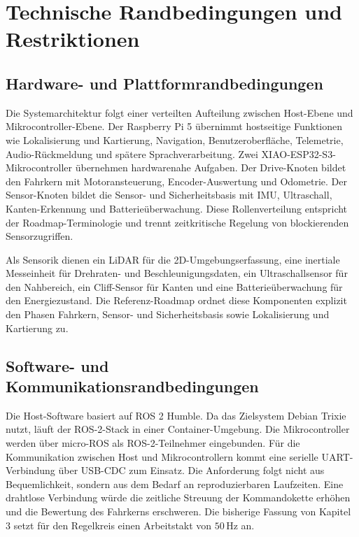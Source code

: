 \section{Technische Randbedingungen und Restriktionen}

\subsection{Hardware- und Plattformrandbedingungen}

Die Systemarchitektur folgt einer verteilten Aufteilung zwischen Host-Ebene und Mikrocontroller-Ebene. Der Raspberry Pi 5 übernimmt hostseitige Funktionen wie Lokalisierung und Kartierung, Navigation, Benutzeroberfläche, Telemetrie, Audio-Rückmeldung und spätere Sprachverarbeitung. Zwei XIAO-ESP32-S3-Mikrocontroller übernehmen hardwarenahe Aufgaben. Der Drive-Knoten bildet den Fahrkern mit Motoransteuerung, Encoder-Auswertung und Odometrie. Der Sensor-Knoten bildet die Sensor- und Sicherheitsbasis mit IMU, Ultraschall, Kanten-Erkennung und Batterieüberwachung. Diese Rollenverteilung entspricht der Roadmap-Terminologie und trennt zeitkritische Regelung von blockierenden Sensorzugriffen.

Als Sensorik dienen ein LiDAR für die 2D-Umgebungserfassung, eine inertiale Messeinheit für Drehraten- und Beschleunigungsdaten, ein Ultraschallsensor für den Nahbereich, ein Cliff-Sensor für Kanten und eine Batterieüberwachung für den Energiezustand. Die Referenz-Roadmap ordnet diese Komponenten explizit den Phasen Fahrkern, Sensor- und Sicherheitsbasis sowie Lokalisierung und Kartierung zu.

\subsection{Software- und Kommunikationsrandbedingungen}

Die Host-Software basiert auf ROS 2 Humble. Da das Zielsystem Debian Trixie nutzt, läuft der ROS-2-Stack in einer Container-Umgebung. Die Mikrocontroller werden über micro-ROS als ROS-2-Teilnehmer eingebunden. Für die Kommunikation zwischen Host und Mikrocontrollern kommt eine serielle UART-Verbindung über USB-CDC zum Einsatz. Die Anforderung folgt nicht aus Bequemlichkeit, sondern aus dem Bedarf an reproduzierbaren Laufzeiten. Eine drahtlose Verbindung würde die zeitliche Streuung der Kommandokette erhöhen und die Bewertung des Fahrkerns erschweren. Die bisherige Fassung von Kapitel 3 setzt für den Regelkreis einen Arbeitstakt von $50\,\mathrm{Hz}$ an.

